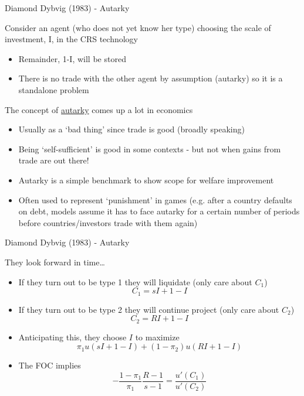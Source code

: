 

\begin{frame}{Diamond Dybvig (1983) - Autarky}

Consider an agent (who does not yet know her type) choosing the scale of investment, I, in the CRS technology
\begin{itemize}
\item	Remainder, 1-I, will be stored
\item	There is no trade with the other agent by assumption (autarky) so it is a standalone problem
\end{itemize}

\vspace{2mm}
The concept of \href{https://en.wikipedia.org/wiki/Autarky}{autarky} comes up a lot in economics
\begin{itemize}
\item	Usually as a `bad thing' since trade is good (broadly speaking)
\item	Being `self-sufficient' is good in some contexts - but not when gains from trade are out there!
\item	Autarky is a simple benchmark to show scope for welfare improvement
\item	Often used to represent `punishment' in games (e.g. after a country defaults on debt, models assume it has to face autarky for a certain number of periods before countries/investors trade with them again)
\end{itemize}

\end{frame}



\begin{frame}{Diamond Dybvig (1983) - Autarky}

They look forward in time\ldots
\begin{itemize}
\item	If they turn out to be type 1 they will liquidate (only care about $C_{1}$)
\[
C_{1} = sI + 1- I
\]
\item	If they turn out to be type 2 they will continue project (only care about $C_{2}$)
\[
C_{2} = RI + 1- I
\]	
\item	Anticipating this, they choose $I$ to maximize
\[
\pi_{1}u(sI + 1- I) + (1-\pi_{2})u(RI + 1- I)
\]
\item	The FOC implies
\[
-\frac{1-\pi_{1}}{\pi_{1}} \frac{R-1}{s-1} = \frac{u'(C_{1})}{u'(C_{2})}
\]
\end{itemize}
	
\end{frame}

